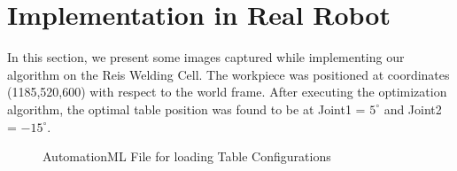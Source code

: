 \section{Implementation in Real Robot}
In this section, we present some images captured while implementing our algorithm on the Reis Welding Cell. The workpiece was positioned at coordinates (1185,520,600) with respect to the world frame. After executing the optimization algorithm, the optimal table position was found to be at Joint1 = $5^{\circ}$ and Joint2 = $-15^{\circ}$.
\begin{figure}[!htbp] %
	\centering
	\caption{AutomationML File for loading Table Configurations}  
	\label{app:rrimg1}
\end{figure}

